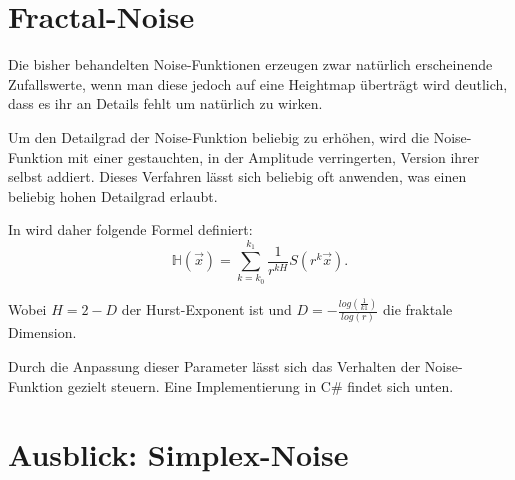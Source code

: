 \section{Fractal-Noise}\label{Fractal-Noise}
Die bisher behandelten Noise-Funktionen erzeugen zwar natürlich erscheinende Zufallswerte, wenn man diese jedoch auf eine Heightmap überträgt wird deutlich, dass es ihr an Details fehlt um natürlich zu wirken.

Um den Detailgrad der Noise-Funktion beliebig zu erhöhen, wird die Noise-Funktion mit einer gestauchten, in der Amplitude verringerten, Version ihrer selbst addiert. 
Dieses Verfahren lässt sich beliebig oft anwenden, was einen beliebig hohen Detailgrad erlaubt.

In \cite{Saupe} wird daher folgende Formel definiert:
\begin{equation}
	\mathbb{H}(\vec{x}) = \sum_{k=k_0}^{k_1}\frac{1}{r^{kH}}S(r^k\vec{x}).
\end{equation}

Wobei $H=2-D$ der Hurst-Exponent ist\cite{tuMuenchen} und $D=-\frac{log(\frac{1}{k1})}{log(r)}$\cite{fraktDim} die fraktale Dimension.

Durch die Anpassung dieser Parameter lässt sich das Verhalten der Noise-Funktion gezielt steuern. Eine Implementierung in C\# findet sich unten.



\section{Ausblick: Simplex-Noise}\label{Simplex-Noise}






